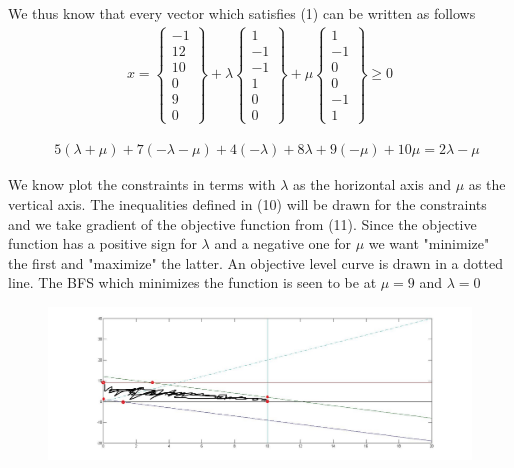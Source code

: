 \documentclass{article}
\begin{document}
  We thus know that every vector which satisfies (1) can be written as
  follows
  \begin{align}
  	x = 
  \begin{Bmatrix} -1 \\ 12 \\10 \\0 \\9 \\0   	\end{Bmatrix}
  + \lambda \begin{Bmatrix} 1 \\ -1 \\ -1 \\ 1 \\0 \\ 0   \end{Bmatrix}
  + \mu \begin{Bmatrix}  1 \\ -1 \\ 0 \\ 0 \\ -1  \\1  \end{Bmatrix} \ge 0
  \end{align}
  
   \begin{align}
    \quad 5(\lambda + \mu) + 7(-\lambda - \mu) + 4(-\lambda) + 8\lambda + 9(-\mu)  +10 \mu = 2\lambda - \mu 
   \end{align}
	
	\clearpage
	
	We know plot the constraints in terms with $\lambda$ as the horizontal axis and $\mu$ as the vertical axis. The inequalities defined in (10) will be drawn for the constraints and we take gradient of the objective function from (11). Since the objective function has a positive sign for $\lambda$ and a negative one for $\mu$ we want "minimize" the first and "maximize" the latter. An objective level curve is drawn in a dotted line. The BFS which minimizes the function is seen to be at $\mu = 9$ and $\lambda=0$
	
	\begin{figure}[htpb]
		\includegraphics[width = \textwidth]{untitled}
	\end{figure}
	
\end{document}
